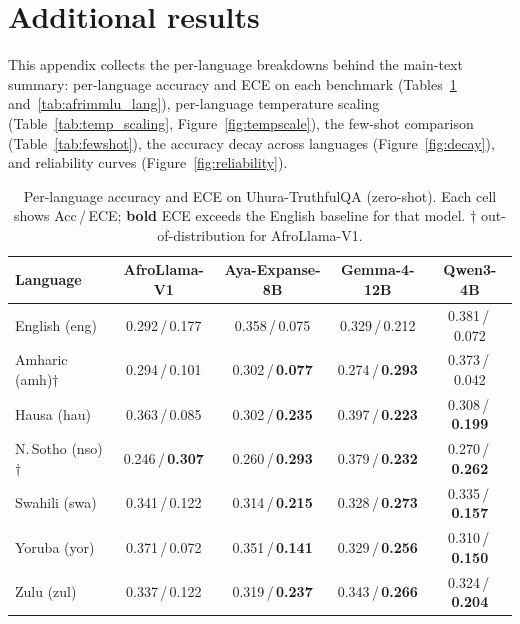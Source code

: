 \documentclass[pmlr]{jmlr}%
\begin{document}
\section{Additional results}\label{app:figs}
This appendix collects the per-language breakdowns behind the main-text summary: per-language accuracy
and ECE on each benchmark (Tables~\ref{tab:uhura_lang} and~\ref{tab:afrimmlu_lang}), per-language
temperature scaling (Table~\ref{tab:temp_scaling}, Figure~\ref{fig:tempscale}), the few-shot comparison
(Table~\ref{tab:fewshot}), the accuracy decay across languages (Figure~\ref{fig:decay}), and reliability
curves (Figure~\ref{fig:reliability}).

\begin{table}[H]\centering\small
\caption{Per-language accuracy and ECE on Uhura-TruthfulQA (zero-shot). Each cell shows Acc\,/\,ECE;
\textbf{bold} ECE exceeds the English baseline for that model. $\dagger$ out-of-distribution for
AfroLlama-V1.}
\label{tab:uhura_lang}
\begin{tabular}{lcccc}
\toprule
\textbf{Language} & \textbf{AfroLlama-V1} & \textbf{Aya-Expanse-8B} & \textbf{Gemma-4-12B} & \textbf{Qwen3-4B}\\
\midrule
English (eng)               & 0.292\,/\,0.177 & 0.358\,/\,0.075 & 0.329\,/\,0.212 & 0.381\,/\,0.072\\
\midrule
Amharic (amh)$\dagger$      & 0.294\,/\,0.101 & 0.302\,/\,\textbf{0.077} & 0.274\,/\,\textbf{0.293} & 0.373\,/\,0.042\\
Hausa (hau)                 & 0.363\,/\,0.085 & 0.302\,/\,\textbf{0.235} & 0.397\,/\,\textbf{0.223} & 0.308\,/\,\textbf{0.199}\\
N.\,Sotho (nso)$\dagger$    & 0.246\,/\,\textbf{0.307} & 0.260\,/\,\textbf{0.293} & 0.379\,/\,\textbf{0.232} & 0.270\,/\,\textbf{0.262}\\
Swahili (swa)               & 0.341\,/\,0.122 & 0.314\,/\,\textbf{0.215} & 0.328\,/\,\textbf{0.273} & 0.335\,/\,\textbf{0.157}\\
Yoruba (yor)                & 0.371\,/\,0.072 & 0.351\,/\,\textbf{0.141} & 0.329\,/\,\textbf{0.256} & 0.310\,/\,\textbf{0.150}\\
Zulu (zul)                  & 0.337\,/\,0.122 & 0.319\,/\,\textbf{0.237} & 0.343\,/\,\textbf{0.266} & 0.324\,/\,\textbf{0.204}\\
\bottomrule
\end{tabular}
\end{table}
\end{document}
